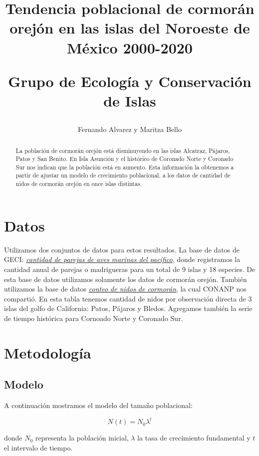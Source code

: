 \documentclass{article} %
\author{Fernando Alvarez y Maritza Bello}
\title{Tendencia poblacional de cormorán orejón en las islas del Noroeste de México 2000-2020\\ \begin{large} Grupo de Ecología y Conservación de Islas \end{large}}
\begin{document}
\maketitle

\begin{abstract}
La población de cormorán orejón está disminuyendo en las islas Alcatraz, Pájaros, Patos y San
Benito. En Isla Asunción y el histórico de Coronado Norte y Coronado Sur nos indican que la
población está en aumento. Esta información la obtenemos a partir de ajustar un modelo de
crecimiento poblacional, a los datos de cantidad de nidos de cormorán orejón en
once islas distintas.

\end{abstract}

\section*{Datos}

Utilizamos dos conjuntos de datos para estos resultados. La base de datos de GECI:
\href{https://drive.google.com/drive/u/0/folders/1K2-itQXbNXPhrz4Pb3eRr9NG9A4rR47o}{{\color{blue}\textit{cantidad
de parejas de aves marinas del pacífico}}}, donde registramos la cantidad anual de parejas o
madrigueras para un total de 9 islas y 18 especies. De esta base de datos utilizamos solamente los
datos de cormorán orejón. También utilizamos la base de datos
\href{https://drive.google.com/drive/folders/1aXmotwcGcZjK52USWMdlZoffaMUlI0tT}{{\color{blue}\textit{\underline{conteo
de nidos de cormorán}}}}, la cual CONANP nos compartió. En esta tabla tenemos cantidad de nidos por
observación directa de 3 islas del golfo de California: Patos, Pájaros y Bledos. Agregamos también
la serie de tiempo histórica para Cornoado Norte y Coronado Sur.


\section*{Metodología}
\subsection*{Modelo}
A continuación mostramos el modelo del tamaño poblacional:

\begin{equation}
N(t)=N_{0}\lambda^{t}
\end{equation}

\noindent donde $N_{0}$ representa la población inicial, $\lambda$ la tasa de crecimiento fundamental y $t$ el intervalo de tiempo. 
\end{document}
